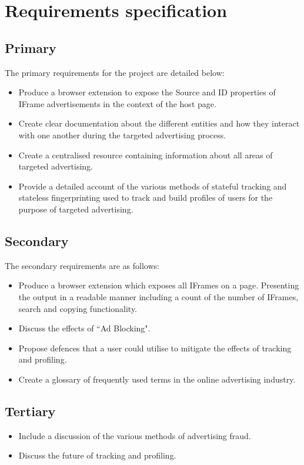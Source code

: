 \documentclass[12pt]{article}
\begin{document}
\pagebreak

\section{Requirements specification} \label{requirements}

\subsection{Primary}
The primary requirements for the project are detailed below:
\begin{itemize}
    \item Produce a browser extension to expose the Source and ID properties of IFrame advertisements in the context of the host page.
    \item Create clear documentation about the different entities and how they interact with one another during the targeted advertising process.
    \item Create a centralised resource containing information about all areas of targeted advertising.
    \item Provide a detailed account of the various methods of stateful tracking and stateless fingerprinting used to track and build profiles of users for the purpose of targeted advertising.
\end{itemize}

\subsection{Secondary}
The secondary requirements are as follows:
\begin{itemize}
    \item Produce a browser extension which exposes all IFrames on a page. Presenting the output in a readable manner including a count of the number of IFrames, search and copying functionality. 
    \item Discuss the effects of ``Ad Blocking". 
    \item Propose defences that a user could utilise to mitigate the effects of tracking and profiling.
    \item Create a glossary of frequently used terms in the online advertising industry.
\end{itemize}

\subsection{Tertiary}
\begin{itemize}
    \item Include a discussion of the various methods of advertising fraud.
    \item Discuss the future of tracking and profiling.
\end{itemize}
\end{document}
